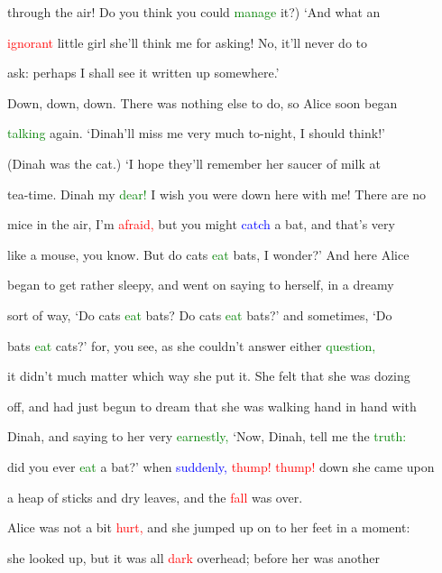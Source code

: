  through the air! Do you think you could \textcolor{green}{manage} it?) ‘And what an

 \textcolor{red}{ignorant} little girl \textcolor{BurntOrange}{she’ll} think me for asking! No, it’ll never do to

 ask: perhaps I shall see it written up somewhere.’



 Down, down, down. There was nothing else to do, so Alice soon began

 \textcolor{green}{talking} again. ‘Dinah’ll miss me very much to-night, I should think!’

 (Dinah was the cat.) ‘I \textcolor{BurntOrange}{hope} they’ll remember her saucer of milk at

 tea-time. Dinah my \textcolor{green}{dear!} I wish you were down here with me! There are no

 mice in the air, I’m \textcolor{red}{afraid,} but you might \textcolor{blue}{catch} a bat, and that’s very

 like a mouse, you know. But do cats \textcolor{green}{eat} bats, I wonder?’ And here Alice

 began to get rather sleepy, and went on saying to herself, in a dreamy

 sort of way, ‘Do cats \textcolor{green}{eat} bats? Do cats \textcolor{green}{eat} bats?’ and sometimes, ‘Do

 bats \textcolor{green}{eat} cats?’ for, you see, as she couldn’t answer either \textcolor{green}{question,}

 it didn’t much matter which way she put it. She felt that she was dozing

 off, and had just begun to dream that she was walking hand in hand with

 Dinah, and saying to her very \textcolor{green}{earnestly,} ‘Now, Dinah, tell me the \textcolor{green}{truth:}

 did you ever \textcolor{green}{eat} a bat?’ when \textcolor{blue}{suddenly,} \textcolor{red}{thump!} \textcolor{red}{thump!} down she came upon

 a heap of sticks and dry leaves, and the \textcolor{red}{fall} was over.



 Alice was not a bit \textcolor{red}{hurt,} and she jumped up on to her feet in a moment:

 she looked up, but it was all \textcolor{red}{dark} overhead; before her was another

